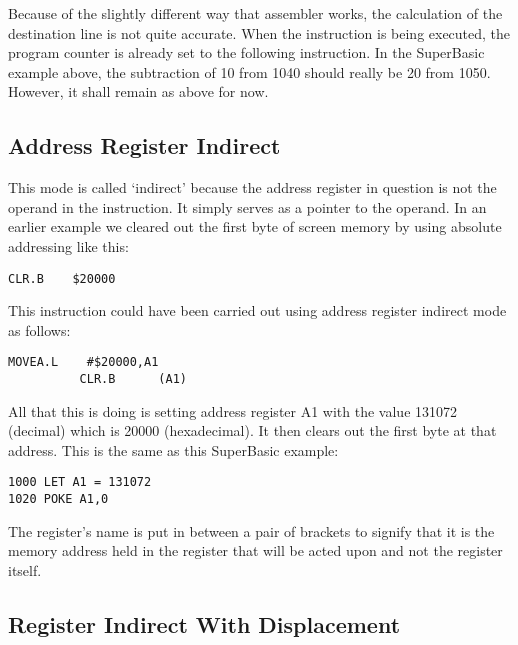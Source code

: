 \begin{note}
Because of the slightly different way that assembler works, the
        calculation of the destination line is not quite accurate. When the
         instruction is being executed, the program counter is already
        set to the following instruction. In the SuperBasic example above, the
        subtraction of 10 from 1040 should really be 20 from 1050. However, it
        shall remain as above for now.
\end{note}

\subsection{Address Register Indirect}\address{Address Register Indirect}

This mode is called `indirect' because the address register in
      question is not the operand in the instruction. It simply serves as a
      pointer to the operand. In an earlier example we cleared out the first
      byte of screen memory by using absolute addressing like this:

\begin{lstlisting}[firstnumber=1,]
          CLR.B    $20000 
\end{lstlisting}

This instruction could have been carried out using address
      register indirect mode as follows:

\begin{lstlisting}[firstnumber=1,]
          MOVEA.L    #$20000,A1
          CLR.B      (A1) 
\end{lstlisting}

All that this is doing is setting address register A1 with the
      value 131072 (decimal) which is 20000 (hexadecimal). It then clears out
      the first byte at that address. This is the same as this SuperBasic
      example:

\begin{lstlisting}[firstnumber=1,language={[Visual]Basic}]
1000 LET A1 = 131072
1020 POKE A1,0 
\end{lstlisting}

The register's name is put in between a pair of brackets to
      signify that it is the memory address held in the register that will be
      acted upon and not the register itself.

\subsection{Register Indirect With Displacement}\address{Register Indirect With Displacement}

